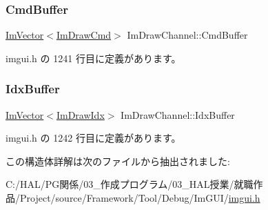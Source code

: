 \subsubsection{\texorpdfstring{Cmd\+Buffer}{CmdBuffer}}
{\footnotesize\ttfamily \mbox{\hyperlink{class_im_vector}{Im\+Vector}}$<$\mbox{\hyperlink{struct_im_draw_cmd}{Im\+Draw\+Cmd}}$>$ Im\+Draw\+Channel\+::\+Cmd\+Buffer}



 imgui.\+h の 1241 行目に定義があります。

\mbox{\label{struct_im_draw_channel_a7fbed7d3523124fadd94859d5ac0fd67}} 
\subsubsection{\texorpdfstring{Idx\+Buffer}{IdxBuffer}}
{\footnotesize\ttfamily \mbox{\hyperlink{class_im_vector}{Im\+Vector}}$<$\mbox{\hyperlink{imgui_8h_afdc8744a5ac1a968b1ddfa47e13b2fa1}{Im\+Draw\+Idx}}$>$ Im\+Draw\+Channel\+::\+Idx\+Buffer}



 imgui.\+h の 1242 行目に定義があります。



この構造体詳解は次のファイルから抽出されました\+:\begin{DoxyCompactItemize}
\item 
C\+:/\+H\+A\+L/\+P\+G関係/03\+\_\+作成プログラム/03\+\_\+\+H\+A\+L授業/就職作品/\+Project/source/\+Framework/\+Tool/\+Debug/\+Im\+G\+U\+I/\mbox{\hyperlink{imgui_8h}{imgui.\+h}}\end{DoxyCompactItemize}
